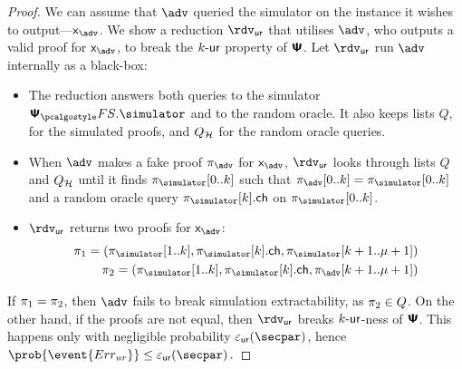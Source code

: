\documentclass[runningheads,11pt]{llncs}
\begin{document}
\begin{proof}
{  We can assume that $\advse$ queried the simulator on the instance it wishes to
  output---$\inp_{\advse}$. We show a reduction $\rdvur$ that utilises $\advse$,
  who outputs a valid proof for $\inp_{\advse}$, to break the ${k\text{-}\mathsf{ur}}$ property of
  $\bm{\mathsf{\Psi}}$. Let $\rdvur$ run $\advse$ internally as a black-box:
\begin{itemize}
	\item The reduction answers both queries to the simulator $\psfs.\simulator$ and to the random oracle. 
	It also keeps lists $Q$, for the simulated proofs, and $Q_{\mathcal{H}}$ for the random oracle queries. 
\item When $\advse$ makes a fake proof $\zkproof_{\advse}$ for $\inp_{\advse}$,
  $\rdvur$ looks through lists $Q$ and $Q_{\mathcal{H}}$ until it finds
  $\zkproof_{\simulator}[0..k]$ such that
  $\zkproof_{\advse}[0..k] = \zkproof_{\simulator}[0..k]$
  and a random oracle query $\zkproof_{\simulator}[k].\ch$ on
  $\zkproof_{\simulator}[0..k]$.
	\item $\rdvur$ returns two proofs for $\inp_{\advse}$:
	\begin{align*}
		\zkproof_1 = (\zkproof_{\simulator}[1..k],
		\zkproof_{\simulator}[k].\ch, \zkproof_{\simulator}[k + 1..\mu + 1])\\
		\zkproof_2 = (\zkproof_{\simulator}[1..k],
		\zkproof_{\simulator}[k].\ch, \zkproof_{\advse}[k + 1..\mu + 1])
	\end{align*}
	\end{itemize}  
	If $\pi_1 = \pi_2$, then $\advse$ fails to break simulation
  extractability, as $\pi_2 \in Q$. On the other hand, if the proofs are
  not equal, then $\rdvur$ breaks ${k\text{-}\mathsf{ur}}$-ness of $\bm{\mathsf{\Psi}}$. This happens only with
  negligible probability $\epsur(\secpar)$, hence \( \prob{\event{\errur}} \leq
  \epsur(\secpar)\,. \)
}

 
\end{proof}
\end{document}
